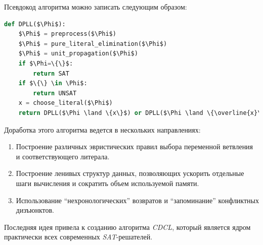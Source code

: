Псевдокод алгоритма можно записать следующим образом:



\lstset{style=mystyle}

\lstset{xleftmargin=1.5cm,frame=tlbr,framesep=8pt,framerule=0pt}

\begin{lstlisting}[language=Python, mathescape=true]
def DPLL($\Phi$):	
	$\Phi$ = preprocess($\Phi$)
 	$\Phi$ = pure_literal_elimination($\Phi$)
 	$\Phi$ = unit_propagation($\Phi$)	
	if $\Phi=\{\}$:
		return SAT
	if $\{\} \in \Phi$:
		return UNSAT
 	x = choose_literal($\Phi$)
	return DPLL($\Phi \land \{x\}$) or DPLL($\Phi \land \{\overline{x}\}$)
\end{lstlisting}

\vspace{5pt}

Доработка этого алгоритма ведется в нескольких направлениях:

\begin{enumerate}[leftmargin=1cm,topsep=0pt,itemsep=-1ex,partopsep=1ex,parsep=1ex,label=\arabic{*}.]
\item Построение различных эвристических правил выбора переменной ветвления и соответствующего литерала.
\item Построение ленивых структур данных, позволяющих ускорить отдельные шаги вычисления и сократить объем используемой памяти.
\item Использование \enquote{нехронологических} возвратов и \enquote{запоминание} конфликтных дизъюнктов. 
\end{enumerate}

Последняя идея привела к созданию алгоритма \textit{CDCL}, который является ядром практически всех современных \textit{SAT}-решателей.

